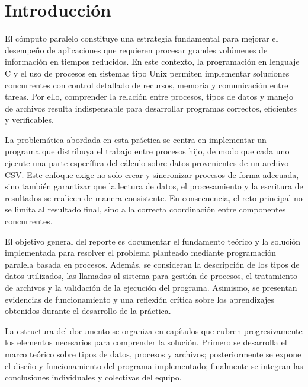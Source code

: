 %
%

\chapter{Introducción}

El cómputo paralelo constituye una estrategia fundamental para mejorar el desempeño de aplicaciones que requieren procesar grandes volúmenes de información en tiempos reducidos. En este contexto, la programación en lenguaje C y el uso de procesos en sistemas tipo Unix permiten implementar soluciones concurrentes con control detallado de recursos, memoria y comunicación entre tareas. Por ello, comprender la relación entre procesos, tipos de datos y manejo de archivos resulta indispensable para desarrollar programas correctos, eficientes y verificables.

La problemática abordada en esta práctica se centra en implementar un programa que distribuya el trabajo entre procesos hijo, de modo que cada uno ejecute una parte específica del cálculo sobre datos provenientes de un archivo CSV. Este enfoque exige no solo crear y sincronizar procesos de forma adecuada, sino también garantizar que la lectura de datos, el procesamiento y la escritura de resultados se realicen de manera consistente. En consecuencia, el reto principal no se limita al resultado final, sino a la correcta coordinación entre componentes concurrentes.

El objetivo general del reporte es documentar el fundamento teórico y la solución implementada para resolver el problema planteado mediante programación paralela basada en procesos. Además, se consideran la descripción de los tipos de datos utilizados, las llamadas al sistema para gestión de procesos, el tratamiento de archivos y la validación de la ejecución del programa. Asimismo, se presentan evidencias de funcionamiento y una reflexión crítica sobre los aprendizajes obtenidos durante el desarrollo de la práctica.

La estructura del documento se organiza en capítulos que cubren progresivamente los elementos necesarios para comprender la solución. Primero se desarrolla el marco teórico sobre tipos de datos, procesos y archivos; posteriormente se expone el diseño y funcionamiento del programa implementado; finalmente se integran las conclusiones individuales y colectivas del equipo.

